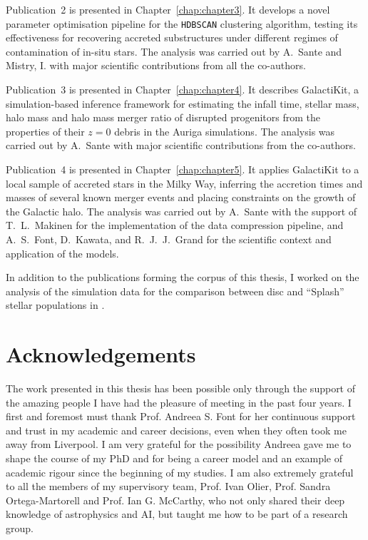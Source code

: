 \documentclass[a4paper,12pt,oneside]{report}
\begin{document}
\bigskip

Publication~2 is presented in Chapter~\ref{chap:chapter3}. It develops
a novel parameter optimisation pipeline for the \texttt{HDBSCAN} clustering algorithm,
testing its effectiveness for recovering accreted substructures under 
different regimes of contamination of in-situ stars.
The analysis was carried out by A.~Sante and Mistry, I. with major scientific
contributions from all the co-authors.

\bigskip

Publication~3 is presented in Chapter~\ref{chap:chapter4}. It describes
GalactiKit, a simulation-based inference framework for estimating the infall
time, stellar mass, halo mass and halo mass merger ratio of disrupted progenitors from
the properties of their $z=0$ debris in the Auriga simulations. The analysis
was carried out by A.~Sante with major scientific contributions from the
co-authors.

\bigskip

Publication~4 is presented in Chapter~\ref{chap:chapter5}. It applies 
GalactiKit to a local sample of accreted stars in the Milky Way,
inferring the accretion times and masses of several known merger events
and placing constraints on the growth of the Galactic halo. The analysis
was carried out by A.~Sante with the support of T.~L.~Makinen for the 
implementation of the data compression pipeline, and A.~S.~Font, D.~Kawata, and
R.~J.~J.~Grand for the scientific context and application of the models.

\bigskip

In addition to the publications forming the corpus of this thesis, I worked
on the analysis of the simulation data for the comparison between disc and
``Splash'' stellar populations in \citet{Kisku2025}.

\chapter*{Acknowledgements}

The work presented in this thesis has been possible only through the support of the amazing people I have had the pleasure of meeting in the past four years.
I first and foremost must thank Prof. Andreea S. Font for her continuous support and trust in my academic and career decisions, even when they often took me away from Liverpool. I am very grateful for the possibility Andreea gave me to shape the course of my PhD and for being a career model and an example of academic rigour since the beginning of my studies. I am also extremely grateful to all the members of my supervisory team, Prof. Ivan Olier, Prof. Sandra Ortega-Martorell and Prof. Ian G. McCarthy, who not only shared their deep knowledge of astrophysics and AI, but taught me how to be part of a research group.
\end{document}
